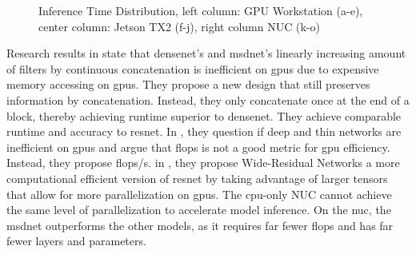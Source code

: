 \begin{figure}
\begin{minipage}{.33\textwidth}
		\hfill
		\hfill
	\end{minipage}
	\caption[Platform Inference Time of \gls{dnn}s]{Inference Time Distribution, left column: GPU Workstation (a-e), center column: Jetson TX2 (f-j), right column NUC (k-o)}
	\label{fig:inference-time-dist}
\end{figure}

Research results in \cite{lee_energy_2019} state that \gls{densenet}'s and \gls{msdnet}’s linearly increasing amount of filters by continuous concatenation is inefficient on \gls{gpu}s due to expensive memory accessing on \gls{gpu}s. They propose a new design that still preserves information by concatenation. Instead, they only concatenate once at the end of a block, thereby achieving runtime superior to \gls{densenet}. They achieve comparable runtime and accuracy to \gls{resnet}. In \cite{lee_energy_2019}, they question if deep and thin networks are inefficient on \gls{gpu}s and argue that \gls{flop}s is not a good metric for \gls{gpu} efficiency. Instead, they propose \gls{flop}s/s. in \cite{zagoruyko_wide_2017}, they propose Wide-Residual Networks a more computational efficient version of \gls{resnet} by taking advantage of larger tensors that allow for more parallelization on \gls{gpu}s. The \gls{cpu}-only NUC cannot achieve the same level of parallelization to accelerate model inference. On the \gls{nuc}, the \gls{msdnet} outperforms the other models, as it requires far fewer \gls{flop}s and has far fewer layers and parameters. 
